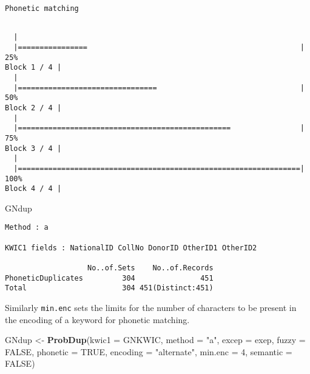 \documentclass[]{article}
\newenvironment{Shaded}{\begin{snugshade}}{\end{snugshade}}
\newcommand{\DataTypeTok}[1]{\textcolor[rgb]{0.13,0.29,0.53}{#1}}
\newcommand{\DecValTok}[1]{\textcolor[rgb]{0.00,0.00,0.81}{#1}}
\newcommand{\KeywordTok}[1]{\textcolor[rgb]{0.13,0.29,0.53}{\textbf{#1}}}
\newcommand{\NormalTok}[1]{#1}
\newcommand{\OtherTok}[1]{\textcolor[rgb]{0.56,0.35,0.01}{#1}}
\newcommand{\StringTok}[1]{\textcolor[rgb]{0.31,0.60,0.02}{#1}}
\begin{document}
\begin{verbatim}
Phonetic matching
\end{verbatim}

\begin{verbatim}

  |                                                                       
  |================                                                 |  25%
Block 1 / 4 |
  |                                                                       
  |================================                                 |  50%
Block 2 / 4 |
  |                                                                       
  |=================================================                |  75%
Block 3 / 4 |
  |                                                                       
  |=================================================================| 100%
Block 4 / 4 |
\end{verbatim}

\begin{Shaded}
\begin{Highlighting}[]
\NormalTok{GNdup}
\end{Highlighting}
\end{Shaded}

\begin{verbatim}
Method : a

KWIC1 fields : NationalID CollNo DonorID OtherID1 OtherID2
 
                   No..of.Sets    No..of.Records
PhoneticDuplicates         304               451
Total                      304 451(Distinct:451)
\end{verbatim}

Similarly \texttt{min.enc} sets the limits for the number of characters
to be present in the encoding of a keyword for phonetic matching.

\begin{Shaded}
\begin{Highlighting}[]
\NormalTok{GNdup <-}\StringTok{ }\KeywordTok{ProbDup}\NormalTok{(}\DataTypeTok{kwic1 =}\NormalTok{ GNKWIC, }\DataTypeTok{method =} \StringTok{"a"}\NormalTok{, }\DataTypeTok{excep =}\NormalTok{ exep, }
                 \DataTypeTok{fuzzy =} \OtherTok{FALSE}\NormalTok{,}
                 \DataTypeTok{phonetic =} \OtherTok{TRUE}\NormalTok{, }\DataTypeTok{encoding =} \StringTok{"alternate"}\NormalTok{, }\DataTypeTok{min.enc =} \DecValTok{4}\NormalTok{,}
                 \DataTypeTok{semantic =} \OtherTok{FALSE}\NormalTok{)}
\end{Highlighting}
\end{Shaded}
\end{document}
